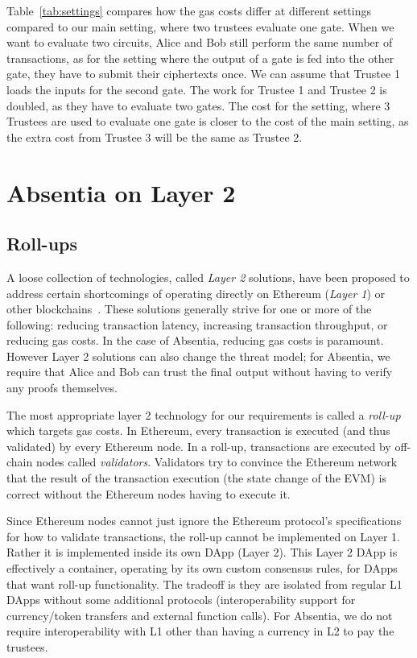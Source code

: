 Table~\ref{tab:settings} compares how the gas costs differ at different settings compared to our main setting, where two trustees evaluate one gate. When we want to evaluate two circuits, Alice and Bob still perform the same number of transactions, as for the setting where the output of a gate is fed into the other gate, they have to submit their ciphertexts once. We can assume that Trustee 1 loads the inputs for the second gate. The work for Trustee 1 and Trustee 2 is doubled, as they have to evaluate two gates. The cost for the setting, where 3 Trustees are used to evaluate one gate is closer to the cost of the main setting, as the extra cost from Trustee 3 will be the same as Trustee 2.



\section{Absentia on Layer 2 }
\label{sec:arb}

\subsection{Roll-ups}

A loose collection of technologies, called \emph{Layer 2} solutions, have been proposed to address certain shortcomings of operating directly on Ethereum (\emph{Layer 1}) or other blockchains~\cite{GMR+20}. These solutions generally strive for one or more of the following: reducing transaction latency, increasing transaction throughput, or reducing gas costs. In the case of Absentia, reducing gas costs is paramount. However Layer 2 solutions can also change the threat model; for Absentia, we require that Alice and Bob can trust the final output without having to verify any proofs themselves. 

The most appropriate layer 2 technology for our requirements is called a \emph{roll-up} which targets gas costs. In Ethereum, every transaction is executed (and thus validated) by every Ethereum node. In a roll-up, transactions are executed by off-chain nodes called \emph{validators}. Validators try to convince the Ethereum network that the result of the transaction execution (\ie the state change of the EVM) is correct without the Ethereum nodes having to execute it. 

Since Ethereum nodes cannot just ignore the Ethereum protocol's specifications for how to validate transactions, the roll-up cannot be implemented on Layer 1. Rather it is implemented inside its own DApp (Layer 2). This Layer 2 DApp is effectively a container, operating by its own custom consensus rules, for DApps that want roll-up functionality. The tradeoff is they are isolated from regular L1 DApps without some additional protocols (\eg interoperability support for currency/token transfers and external function calls). For Absentia, we do not require interoperability with L1 other than having a currency in L2 to pay the trustees.

